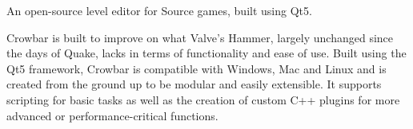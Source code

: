An open-\/source level editor for Source games, built using Qt5.

Crowbar is built to improve on what Valve's Hammer, largely unchanged since the days of Quake, lacks in terms of functionality and ease of use. Built using the Qt5 framework, Crowbar is compatible with Windows, Mac and Linux and is created from the ground up to be modular and easily extensible. It supports scripting for basic tasks as well as the creation of custom C++ plugins for more advanced or performance-\/critical functions. 